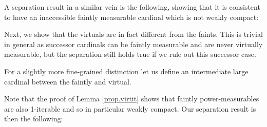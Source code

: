 \documentclass[../../main]{subfiles}
\begin{document}
\qquad A separation result in a similar vein is the following, showing that it is consistent to have an inaccessible faintly measurable cardinal which is not weakly compact:


Next, we show that the virtuals are in fact different from the faints. This is trivial in general as successor cardinals can be faintly measurable and are never virtually measurable, but the separation still holds true if we rule out this successor case.

For a slightly more fine-grained distinction let us define an intermediate large cardinal between the faintly and virtual.


Note that the proof of Lemma \ref{prop.virtit} shows that faintly power-measurables are also 1-iterable and so in particular weakly compact. Our separation result is then the following:
\end{document}

